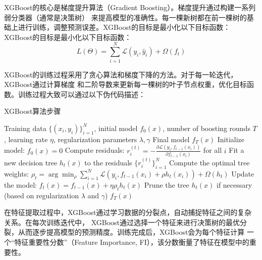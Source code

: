 \documentclass{article}
\begin{document}
XGBoost的核心是梯度提升算法（Gradient Boosting）。梯度提升通过构建一系列弱分类器（通常是决策树）
来提高模型的准确性。每一棵新树都在前一棵树的基础上进行训练，调整预测误差。XGBoost的目标是最小化以下目标函数：
XGBoost的目标是最小化以下目标函数：
\begin{equation}
L(\Theta) = \sum_{i=1}^{N} \mathcal{L}(y_i, \hat{y}_i) + \Omega(f_t)
\end{equation}

XGBoost的训练过程采用了贪心算法和梯度下降的方法。对于每一轮迭代，XGBoost通过计算梯度
和二阶导数来更新每一棵树的叶子节点权重，优化目标函数。训练过程大致可以通过以下伪代码描述：
\begin{algorithm}[H]
  \caption{XGBoost算法步骤}
  \begin{algorithmic}[1]
    \Require Training data $\{(x_i, y_i)\}_{i=1}^{N}$, initial model $f_0(x)$, number of boosting rounds $T$, learning rate $\eta$, regularization parameters $\lambda, \gamma$
    \Ensure Final model $f_T(x)$
    \State Initialize model: $f_0(x) = 0$
      \State Compute residuals: $r_i^{(t)} = -\frac{\partial \mathcal{L}(y_i, f_{t-1}(x_i))}{\partial f_{t-1}(x_i)}$ for all $i$
      \State Fit a new decision tree $h_t(x)$ to the residuals $\{r_i^{(t)}\}_{i=1}^{N}$
      \State Compute the optimal tree weights: $\rho_t = \arg\min_{\rho} \sum_{i=1}^{N} \mathcal{L}(y_i, f_{t-1}(x_i) + \rho h_t(x_i)) + \Omega(h_t)$
      \State Update the model: $f_t(x) = f_{t-1}(x) + \eta \rho_t h_t(x)$
      \State Prune the tree $h_t(x)$ if necessary (based on regularization $\lambda$ and $\gamma$)
    \EndFor
    \Return $f_T(x)$
  \end{algorithmic}
\end{algorithm}
在特征提取过程中，XGBoost通过学习数据的分裂点，自动捕捉特征之间的复杂关系。在每次训练迭代中，
XGBoost通过选择一个特征来进行决策树的最优分裂，从而逐步提高模型的预测精度。训练完成后，XGBoost会为每个特征计算
一个“特征重要性分数”（Feature Importance, FI），该分数衡量了特征在模型中的重要性。
\end{document}
